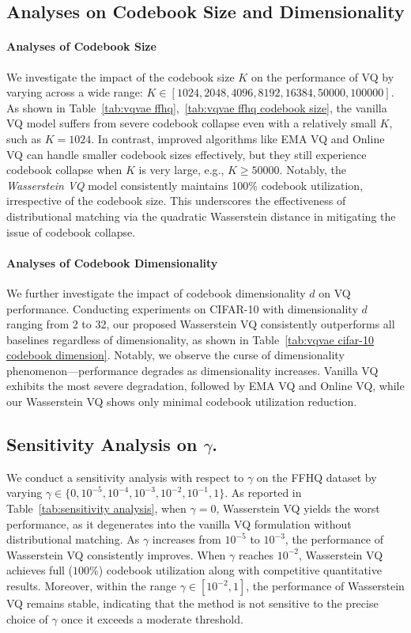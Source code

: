 \subsection{Analyses on Codebook Size and Dimensionality}
\label{appendix:ablation study}

\paragraph{Analyses of Codebook Size} We investigate the impact of the codebook size $K$  on the performance of VQ by varying across a wide range: $K \in [1024, 2048, 4096, 8192, 16384, 50000, 100000]$. As shown in Table~\ref{tab:vqvae ffhq},~\ref{tab:vqvae ffhq codebook size}, the vanilla VQ model suffers from severe codebook collapse even with a relatively small $K$, such as $K=1024$. In contrast, improved algorithms like EMA VQ and Online VQ can handle smaller codebook sizes effectively, but they still experience codebook collapse when $K$ is very large, e.g., $K\geq 50000$.
Notably, the \emph{Wasserstein VQ} model consistently maintains 100\% codebook utilization, irrespective of the codebook size. This underscores the effectiveness of distributional matching via the quadratic Wasserstein distance in mitigating the issue of codebook collapse.

\paragraph{Analyses of Codebook Dimensionality} We further investigate the impact of codebook dimensionality $d$ on VQ performance. Conducting experiments on CIFAR-10 with dimensionality $d$ ranging from 2 to 32, our proposed Wasserstein VQ consistently outperforms all baselines regardless of dimensionality, as shown in Table~\ref{tab:vqvae cifar-10 codebook dimension}. Notably, we observe the curse of dimensionality phenomenon—performance degrades as dimensionality increases. Vanilla VQ exhibits the most severe degradation, followed by EMA VQ and Online VQ, while our Wasserstein VQ shows only minimal codebook utilization reduction.




\subsection{Sensitivity Analysis on $\gamma$.}
\label{appendix:sensitivity analysis}
We conduct a sensitivity analysis with respect to $\gamma$ on the FFHQ dataset by varying $\gamma \in \{0, 10^{-5}, 10^{-4}, 10^{-3}, 10^{-2}, 10^{-1}, 1\}$. As reported in Table~\ref{tab:sensitivity analysis}, when $\gamma = 0$, Wasserstein VQ yields the worst performance, as it degenerates into the vanilla VQ formulation without distributional matching. As $\gamma$ increases from $10^{-5}$ to $10^{-3}$, the performance of Wasserstein VQ consistently improves. When $\gamma$ reaches $10^{-2}$, Wasserstein VQ achieves full ($100\%$) codebook utilization along with competitive quantitative results. Moreover, within the range $\gamma \in [10^{-2}, 1]$, the performance of Wasserstein VQ remains stable, indicating that the method is not sensitive to the precise choice of $\gamma$ once it exceeds a moderate threshold.


